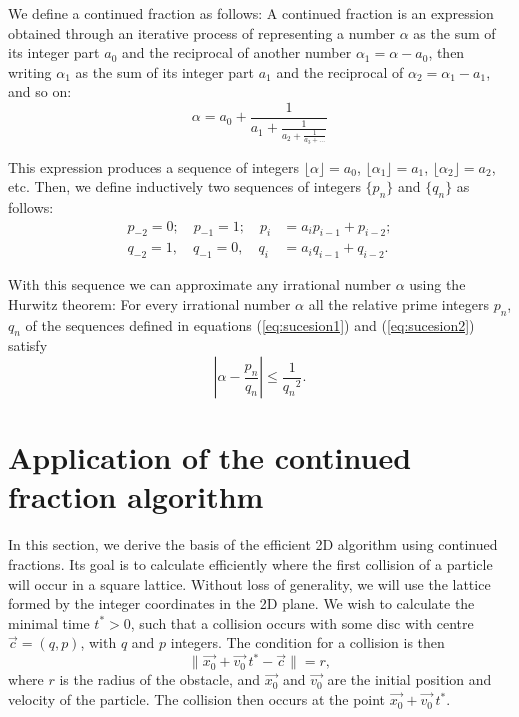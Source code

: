 \documentclass{iopart}
\newcommand{\eqref}[1]{(\ref{#1})}
\begin{document}
We define a continued fraction as follows:
A continued fraction is an expression obtained through an iterative process of representing a number $\alpha$ as the sum of its integer part $a_0$ and the reciprocal of another number $\alpha_1=\alpha-a_0$, then writing $\alpha_1$ as the sum of its integer part $a_1$ and the reciprocal of $\alpha_2=\alpha_1-a_1$, and so on:
\begin{equation*}
  \alpha = a_0 + \frac{1}{\displaystyle a_1
          + \frac{1}{\displaystyle a_2
          + \frac{1}{\displaystyle a_3 + \dots}}}
\end{equation*}

This expression produces a sequence of integers $\lfloor \alpha \rfloor=a_0$, $\lfloor \alpha_1 \rfloor=a_1$, $\lfloor \alpha_2 \rfloor=a_2$, etc. 
Then, we define inductively two sequences of integers $\{ p_n\}$ and $\{ q_n\}$ as follows:
%
\begin{eqnarray}
p_{-2} = 0;  \quad p_{-1} = 1;  \quad p_i &=a_i p_{i-1}+p_{i-2};
\label{eq:sucesion1}
\\ 
q_{-2} = 1,  \quad q_{-1} = 0,  \quad q_i &=a_i q_{i-1}+q_{i-2}.
\label{eq:sucesion2}
\end{eqnarray}

With this sequence we can approximate any irrational number $\alpha$ using the Hurwitz theorem:
For every irrational number $\alpha$ all the relative prime integers $p_n$, $q_n$ of the sequences defined in equations \eqref{eq:sucesion1} and \eqref{eq:sucesion2} satisfy 
\begin{equation}
|\alpha- \frac{p_n}{q_n}|\leq  \frac{1}{{q_n}^2}.
\end{equation}



\section{Application of the continued fraction algorithm}
\label{algorithm}

In this section, we derive the basis of the efficient 2D algorithm using continued fractions.
Its goal is to calculate efficiently where the first collision of a particle will occur in a square lattice. Without loss of generality, we will use the lattice formed by the integer coordinates in the 2D plane. We wish to calculate the minimal time $t^{\ast}>0$, such that a collision occurs with some disc with centre $\vec{c}=(q,p)$, with $q$ and $p$ integers. The condition for a collision is then 
\begin{equation}
\|\vec{x_0}+\vec{v_0} \, t^{\ast} -  \vec{c} \| = r,
\label{eq:classical}
\end{equation}
where $r$ is the radius of the obstacle, and $\vec{x_0}$ and $\vec{v_0}$ are the initial position and velocity of the particle. The collision then occurs at the point 
$\vec{x_0}+\vec{v_0} \, t^{\ast}$.
\end{document}
